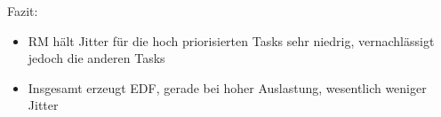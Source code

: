\begin{frame}{\subsecname}
	Fazit:
	\begin{itemize}
		\item RM hält Jitter für die hoch priorisierten Tasks sehr niedrig, vernachlässigt jedoch die anderen Tasks
		\item Insgesamt erzeugt EDF, gerade bei hoher Auslastung, wesentlich weniger Jitter
	\end{itemize}
\end{frame}

%